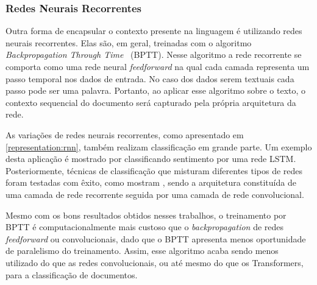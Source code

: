 \subsubsection{Redes Neurais Recorrentes}

Outra forma de encapsular o contexto presente na linguagem é utilizando redes
neurais recorrentes.
Elas são, em geral, treinadas com o algoritmo
\textit{Backpropagation Through Time}~\cite{williams95} (BPTT).
Nesse algoritmo a rede recorrente se comporta como uma rede neural
\textit{feedforward} na qual cada camada representa um passo temporal nos dados
de entrada.
No caso dos dados serem textuais cada passo pode ser uma palavra.
Portanto, ao aplicar esse algoritmo sobre o texto, o contexto sequencial do
documento será capturado pela própria arquitetura da rede.

As variações de redes neurais recorrentes, como apresentado em
\ref{representation:rnn}, também realizam classificação em grande parte.
Um exemplo desta aplicação é mostrado por \citet{tai15} classificando sentimento
por uma rede LSTM.
Posteriormente, técnicas de classificação que misturam diferentes tipos de redes
foram testadas com êxito, como mostram \citet{zhou16}, sendo a arquitetura
constituída de uma camada de rede recorrente seguida por uma camada de rede
convolucional.

Mesmo com os bons resultados obtidos nesses trabalhos, o treinamento por BPTT é
computacionalmente mais custoso que o \textit{backpropagation} de redes
\textit{feedforward} ou convolucionais, dado que o BPTT apresenta menos
oportunidade de paralelismo do treinamento.
Assim, esse algoritmo acaba sendo menos utilizado do que as redes
convolucionais, ou até mesmo do que os Transformers, para a classificação de documentos.

%
%
